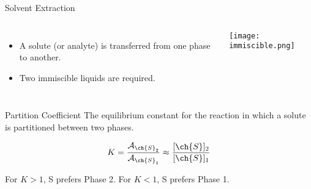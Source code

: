 \documentclass[11pt,letterpaper]{article}
\begin{document}


\begin{frame}{Solvent Extraction}
	\begin{columns}
	\begin{itemize}
		\item A solute (or analyte) is transferred from one phase to
			another.
		\item Two \alert{immiscible} liquids are required.
	\end{itemize}

		\begin{center}
			\texttt{[image: immiscible.png]}
		\end{center}
	\end{columns}

	\begin{block}{Partition Coefficient}
		The equilibrium constant for the reaction in which a solute is
		partitioned between two phases.

		\begin{equation*}
			K =
			\frac{\mathcal{A}_{\ch{S}_2}}{\mathcal{A}_{\ch{S}_1}}
			\approx \frac{[\ch{S}]_2}{[\ch{S}]_1}
		\end{equation*}

		For $K > 1$, S prefers Phase 2. For $K < 1$, S prefers Phase 1.
	\end{block}
\end{frame}

\end{document}
